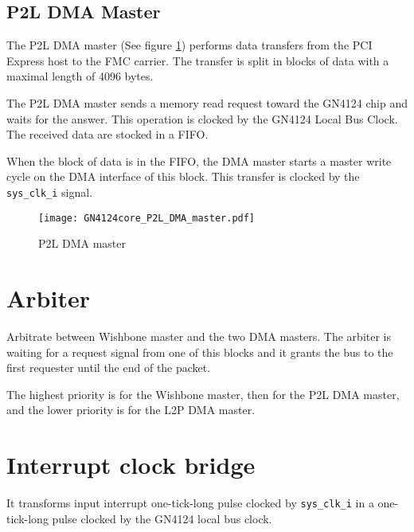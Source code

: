 \documentclass[10pt,a4paper]{cerndoc}
\begin{document}
  \subsection{P2L DMA Master}
  The P2L DMA master (See figure \ref{fig:GN4124core_p2l_dma_master}) performs data transfers from the PCI Express host to the FMC carrier. The transfer is split in blocks of data with a maximal length of 4096 bytes.

  The P2L DMA master sends a memory read request toward the GN4124 chip and waits for the answer. This operation is clocked by the GN4124 Local Bus Clock. The received data are stocked in a FIFO.

  When the block of data is in the FIFO, the DMA master starts a master write cycle on the DMA interface of this block. This transfer is clocked by the \verb+sys_clk_i+ signal.

  \begin{figure}[!ht]
   \centering
   \texttt{[image: GN4124core\_P2L\_DMA\_master.pdf]}
   \caption{P2L DMA master}
   \label{fig:GN4124core_p2l_dma_master}
  \end{figure}


 \section{Arbiter}
 Arbitrate between Wishbone master and the two DMA masters. The arbiter is waiting for a request signal from one of this blocks and it grants the bus to the first requester until the end of the packet.

 The highest priority is for the Wishbone master, then for the P2L DMA master, and the lower priority is for the L2P DMA master.


 \section{Interrupt clock bridge}
  It transforms input interrupt one-tick-long pulse clocked by \verb+sys_clk_i+ in a one-tick-long pulse clocked by the GN4124 local bus clock.
\end{document}

